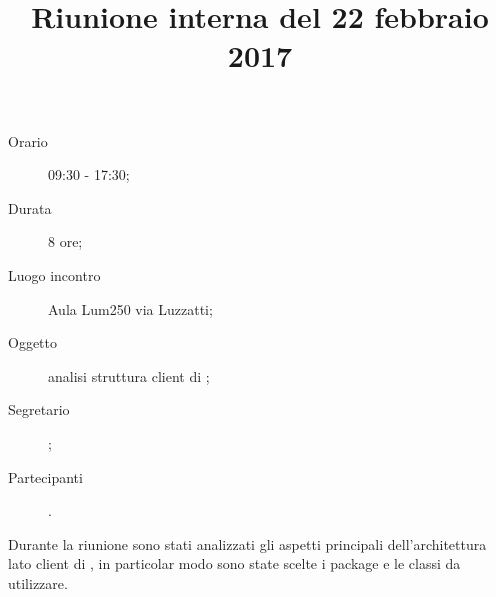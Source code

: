 


\author{\LS}
\supervisor{\LB}
\title{Riunione interna del 22 febbraio 2017}



\maketitle

\begin{description}
	\item[Orario] 09:30 - 17:30;
	\item[Durata] 8 ore;
	\item[Luogo incontro] Aula Lum250 via Luzzatti;
	\item[Oggetto] analisi struttura client di \proj{};
	\item[Segretario] \LS; 
	\item[Partecipanti] \ALL.
\end{description}
Durante la riunione sono stati analizzati gli aspetti principali dell'architettura lato client di \proj{}, in particolar modo sono state scelte i package e le classi da utilizzare.

